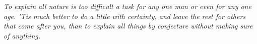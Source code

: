 \begin{newpage}
  \vspace*{\fill} %
	\thispagestyle{empty}
	\setlength{\baselineskip}{1.5\baselineskip} %
  \begin{citacaodireta}
    \textit{\textit{To explain all nature is too difficult a task for any one man or even for any one age. 'Tis much better to do a little with certainty, and leave the rest for others that come after you, than to explain all things by conjecture without making sure of anything.} }
  \end{citacaodireta}
\end{newpage}
\clearpage






